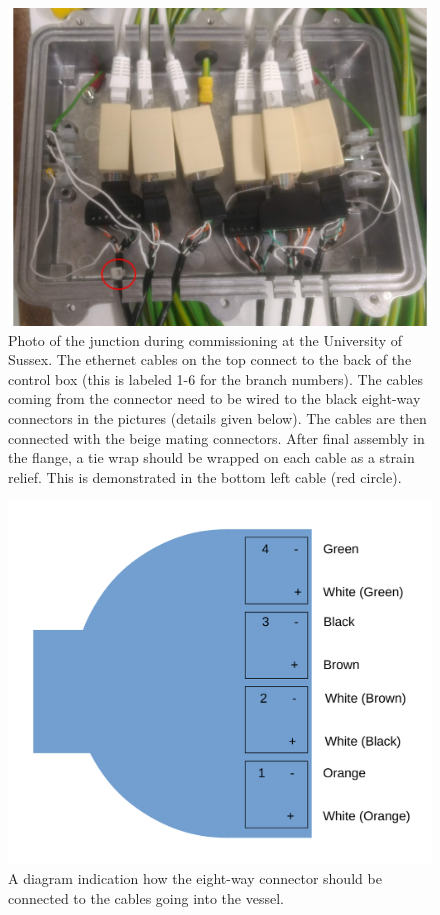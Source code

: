 \begin{figure}
\begin{center}	
  \includegraphics[width=0.75\linewidth]{figures/junction_box.jpg}
  \caption{Photo of the junction during commissioning at the University of Sussex. The ethernet cables on the top connect to the back of the control box (this is labeled 1-6 for the branch numbers). The cables coming from the connector need to be wired to the black eight-way connectors in the pictures (details given below). The cables are then connected with the beige mating connectors. After final assembly in the flange, a tie wrap should be wrapped on each cable as a strain relief. This is demonstrated in the bottom left cable (red circle). }
  \label{figure:junction_box}
\end{center}
\end{figure}

\begin{figure}
\begin{center}	
  \includegraphics[width=0.5\linewidth]{figures/connector.pdf}
  \caption{A diagram indication how the eight-way connector should be connected to the cables going into the vessel.}
  \label{figure:connector}
\end{center}
\end{figure}


